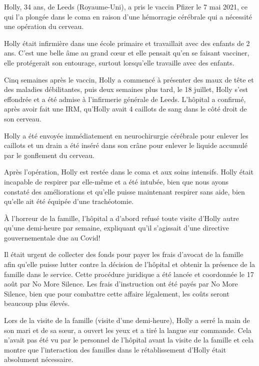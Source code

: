 Holly, 34 ans, de Leeds (Royaume-Uni), a pris le vaccin Pfizer le 7 mai 2021, ce
qui l'a plongée dans le coma en raison d'une hémorragie cérébrale qui a
nécessité une opération du cerveau.

Holly était infirmière dans une école primaire et travaillait avec des enfants
de 2 ans. C'est une belle âme au grand cœur et elle pensait qu'en se faisant
vacciner, elle protégerait son entourage, surtout lorsqu'elle travaille avec des
enfants.

Cinq semaines après le vaccin, Holly a commencé à présenter des maux de tête et
des maladies débilitantes, puis deux semaines plus tard, le 18 juillet, Holly
s'est effondrée et a été admise à l'infirmerie générale de Leeds. L'hôpital a
confirmé, après avoir fait une IRM, qu'Holly avait 4 caillots de sang dans le
côté droit de son cerveau.

Holly a été envoyée immédiatement en neurochirurgie cérébrale pour enlever les
caillots et un drain a été inséré dans son crâne pour enlever le liquide
accumulé par le gonflement du cerveau.

Après l'opération, Holly est restée dans le coma et aux soins intensifs. Holly
était incapable de respirer par elle-même et a été intubée, bien que nous ayons
constaté des améliorations et qu'elle puisse maintenant respirer sans aide, bien
qu'elle ait été équipée d'une trachéotomie.

À l'horreur de la famille, l'hôpital a d'abord refusé toute visite d'Holly autre
qu'une demi-heure par semaine, expliquant qu'il s'agissait d'une directive
gouvernementale due au Covid!

Il était urgent de collecter des fonds pour payer les frais d'avocat de la
famille afin qu'elle puisse lutter contre la décision de l'hôpital et obtenir la
présence de la famille dans le service. Cette procédure juridique a été lancée
et coordonnée le 17 août par No More Silence. Les frais d'instruction ont été
payés par No More Silence, bien que pour combattre cette affaire légalement, les
coûts seront beaucoup plus élevés.

Lors de la visite de la famille (visite d'une demi-heure), Holly a serré la main
de son mari et de sa sœur, a ouvert les yeux et a tiré la langue sur
commande. Cela n'avait pas été vu par le personnel de l'hôpital avant la visite
de la famille et cela montre que l'interaction des familles dans le
rétablissement d'Holly était absolument nécessaire.

